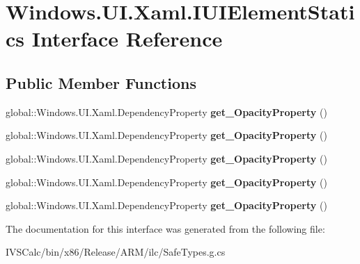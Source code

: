 \hypertarget{interface_windows_1_1_u_i_1_1_xaml_1_1_i_u_i_element_statics}{}\section{Windows.\+U\+I.\+Xaml.\+I\+U\+I\+Element\+Statics Interface Reference}
\label{interface_windows_1_1_u_i_1_1_xaml_1_1_i_u_i_element_statics}
\subsection*{Public Member Functions}
\begin{DoxyCompactItemize}
\item 
\mbox{\label{interface_windows_1_1_u_i_1_1_xaml_1_1_i_u_i_element_statics_afd16cd3bbdae54c67c4b39382949244a}} 
global\+::\+Windows.\+U\+I.\+Xaml.\+Dependency\+Property {\bfseries get\+\_\+\+Opacity\+Property} ()
\item 
\mbox{\label{interface_windows_1_1_u_i_1_1_xaml_1_1_i_u_i_element_statics_afd16cd3bbdae54c67c4b39382949244a}} 
global\+::\+Windows.\+U\+I.\+Xaml.\+Dependency\+Property {\bfseries get\+\_\+\+Opacity\+Property} ()
\item 
\mbox{\label{interface_windows_1_1_u_i_1_1_xaml_1_1_i_u_i_element_statics_afd16cd3bbdae54c67c4b39382949244a}} 
global\+::\+Windows.\+U\+I.\+Xaml.\+Dependency\+Property {\bfseries get\+\_\+\+Opacity\+Property} ()
\item 
\mbox{\label{interface_windows_1_1_u_i_1_1_xaml_1_1_i_u_i_element_statics_afd16cd3bbdae54c67c4b39382949244a}} 
global\+::\+Windows.\+U\+I.\+Xaml.\+Dependency\+Property {\bfseries get\+\_\+\+Opacity\+Property} ()
\item 
\mbox{\label{interface_windows_1_1_u_i_1_1_xaml_1_1_i_u_i_element_statics_afd16cd3bbdae54c67c4b39382949244a}} 
global\+::\+Windows.\+U\+I.\+Xaml.\+Dependency\+Property {\bfseries get\+\_\+\+Opacity\+Property} ()
\end{DoxyCompactItemize}


The documentation for this interface was generated from the following file\+:\begin{DoxyCompactItemize}
\item 
I\+V\+S\+Calc/bin/x86/\+Release/\+A\+R\+M/ilc/Safe\+Types.\+g.\+cs\end{DoxyCompactItemize}

